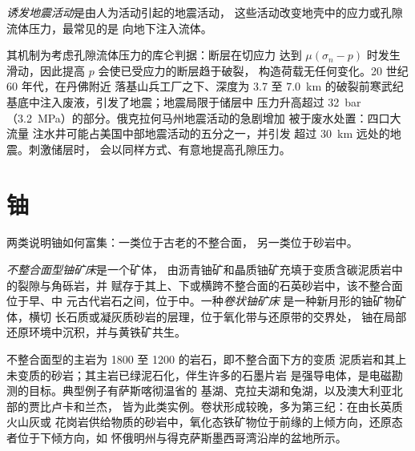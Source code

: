 \begin{definition}[诱发地震活动]\label{def:b2:energy-geology:induced}
\emph{诱发地震活动}是由人为活动引起的地震活动，
这些活动改变地壳中的应力或孔隙流体压力，最常见的是
向地下注入流体。
\end{definition}

其机制为考虑孔隙流体压力的库仑判据：断层在切应力
达到 $\mu(\sigma_n - p)$ 时发生滑动，因此提高 $p$ 会使已受应力的断层趋于破裂，
构造荷载无任何变化。20 世纪 60 年代，在丹佛附近
落基山兵工厂之下、深度为 3.7 至
\qty{7.0}{km} 的破裂前寒武纪基底中注入废液，引发了地震；地震局限于储层中
压力升高超过 \qty{32}{bar}（\qty{3.2}{MPa}）的部分。俄克拉何马州地震活动的急剧增加
被于废水处置：四口大流量
注水井可能占美国中部地震活动的五分之一，并引发
超过 \qty{30}{km} 远处的地震。刺激储层时，
会以同样方式、有意地提高孔隙压力。

\section{铀}\label{sec:b2:energy-geology:uranium}

两类说明铀如何富集：一类位于古老的不整合面，
另一类位于砂岩中。

\begin{definition}[不整合面型和卷状铀矿床]\label{def:b2:energy-geology:uranium}
\emph{不整合面型铀矿床}是一个矿体，
由沥青铀矿和晶质铀矿充填于变质含碳泥质岩中的裂隙与角砾岩，并
赋存于其上、下或横跨不整合面的石英砂岩中，该不整合面位于早、中
元古代岩石之间，位于中。一种\emph{卷状铀矿床}
是一种新月形的铀矿物矿体，横切
长石质或凝灰质砂岩的层理，位于氧化带与还原带的交界处，
铀在局部还原环境中沉积，并与黄铁矿共生。
\end{definition}

不整合面型的主岩为 1800 至 \qty{1200}{\Ma} 的岩石，即不整合面下方的变质
泥质岩和其上未变质的砂岩；其主岩已绿泥石化，伴生许多的石墨片岩
是强导电体，是电磁勘测的目标。典型例子有萨斯喀彻温省的
基湖、克拉夫湖和兔湖，以及澳大利亚北部的贾比卢卡和兰杰，
皆为此类实例。卷状形成较晚，多为第三纪：在由长英质火山灰或
花岗岩供给物质的砂岩中，氧化态铁矿物位于前缘的上倾方向，还原态者位于下倾方向，如
怀俄明州与得克萨斯墨西哥湾沿岸的盆地所示。

